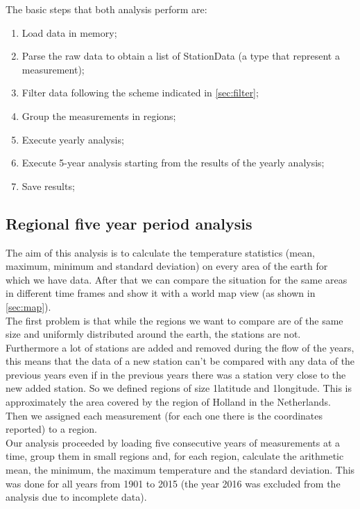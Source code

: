 \documentclass{vldb}
\begin{document}
The basic steps that both analysis perform are:
\begin{enumerate}
    \item Load data in memory;
    \item Parse the raw data to obtain a list of StationData (a type that represent a measurement);
    \item Filter data following the scheme indicated in \ref{sec:filter};
    \item Group the measurements in regions;
    \item Execute yearly analysis;
    \item Execute 5-year analysis starting from the results of the yearly analysis;
    \item Save results;
\end{enumerate}

\subsection{Regional five year period analysis}
The aim of this analysis is to calculate the temperature statistics (mean, maximum, minimum and standard deviation) on every area of the earth for which we have data. After that we can compare the situation for the same areas in different time frames and show it with a world map view (as shown in \ref{sec:map}). \\
The first problem is that while the regions we want to compare are of the same size and uniformly distributed around the earth, the stations are not. Furthermore a lot of stations are added and removed during the flow of the years, this means that the data of a new station can't be compared with any data of the previous years even if in the previous years there was a station very close to the new added station. So we defined regions of size 1\degree latitude and 1\degree longitude. This is approximately the area covered by the region of Holland in the Netherlands. Then we assigned each measurement (for each one there is the coordinates reported) to a region. \\
Our analysis proceeded by loading five consecutive years of measurements at a time, group them in small regions and, for each region, calculate the arithmetic mean, the minimum, the maximum temperature and the standard deviation. This was done for all years from 1901 to 2015 (the year 2016 was excluded from the analysis due to incomplete data).\\
\end{document}
